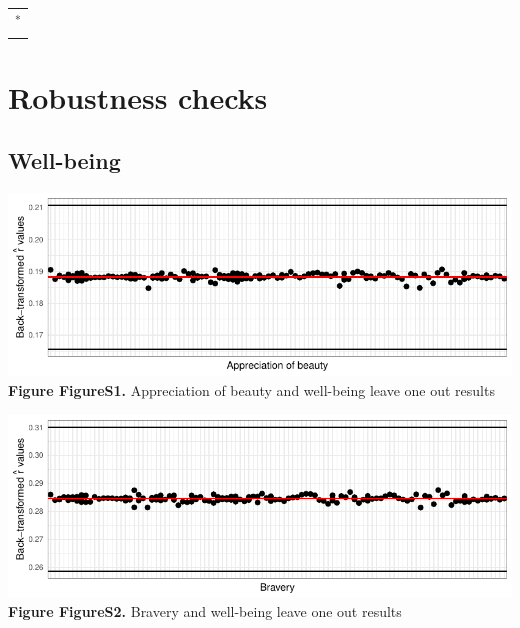 \documentclass[
  letterpaper,
  DIV=11,
  numbers=noendperiod]{scrartcl}
\begin{document}
\begin{table}[H]
{\begin{tabular}[t]{lccccccccccc}
\bottomrule
{}\\
\end{tabular}}
\end{table}

\newpage

\hypertarget{robustness-checks}{%
\section{Robustness checks}\label{robustness-checks}}

\hypertarget{well-being}{%
\subsection{Well-being}\label{well-being}}

\includegraphics{SupplementaryResults_files/figure-pdf/unnamed-chunk-11-1.pdf}\textbf{Figure
FigureS1.} Appreciation of beauty and well-being leave one out results

\includegraphics{SupplementaryResults_files/figure-pdf/unnamed-chunk-11-2.pdf}\textbf{Figure
FigureS2.} Bravery and well-being leave one out results
\end{document}
